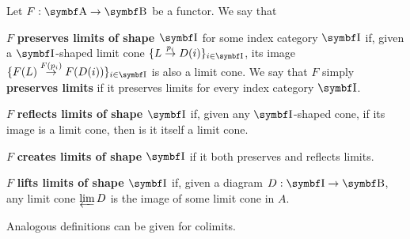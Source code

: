 \begin{definition}\label{def:categorical_limit_preservation}\cite[definitions 5.3.1, 5.3.5]{Leinster2014}
  Let \( F: \Bold A \to \Bold B \) be a functor. We say that
  \begin{defenum}
     \( F \) \textbf{preserves limits of shape \( \Bold I \)} for some index category \( \Bold I \) if, given a \( \Bold I \)-shaped limit cone \mbox{\( \{ L \overset {p_i} \to D(i) \}_{i \in \Bold I} \)}, its image \mbox{\( \{ F(L) \overset {F(p_i)} \to F(D(i)) \}_{i \in \Bold I} \)} is also a limit cone. We say that \( F \) simply \textbf{preserves limits} if it preserves limits for every index category \( \Bold I \).

     \( F \) \textbf{reflects limits of shape \( \Bold I \)} if, given any \( \Bold I \)-shaped cone, if its image is a limit cone, then is it itself a limit cone.

     \( F \) \textbf{creates limits of shape \( \Bold I \)} if it both preserves and reflects limits.

     \( F \) \textbf{lifts limits of shape \( \Bold I \)} if, given a diagram \( D: \Bold I \to \Bold B \), any limit cone \( \varprojlim D \) is the image of some limit cone in \( A \).
  \end{defenum}
\end{definition}

\begin{note}\label{note:categorical_colimit_preservation}
  Analogous definitions can be given for colimits.
\end{note}
